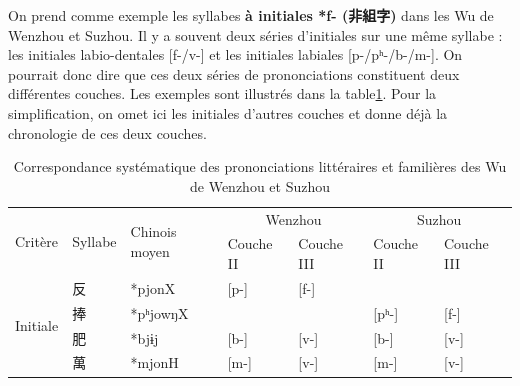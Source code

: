 \documentclass{scrbook}
\newcounter{c}[subsubsection]
\newcommand{\difwenbai}{couches archaïque et récente\xspace}
\newcommand{\illustre}{Les exemples sont illustrés dans la table\xspace}
\newcommand{\termyyx}[1]{\textbf{#1}}
\begin{document}
\begin{sloppypar}
On prend comme exemple les syllabes \termyyx{à initiales *f- (非組字)} dans les Wu de Wenzhou et Suzhou. Il y a souvent deux séries d'initiales sur une même syllabe : les initiales labio-dentales [f-/v-] et les initiales labiales [p-/pʰ-/b-/m-]. On pourrait donc dire que ces deux séries de prononciations constituent deux différentes couches. \illustre \ref{tab:exemple_corsp_syst_wenzhou_suzhou}. Pour la simplification, on omet ici les initiales d'autres couches et donne déjà la chronologie de ces deux couches.

\begin{table}[htbp]
  \centering
    \begin{tabular}{lllllll}
    \toprule
    \multirow{2}[2]{*}{Critère} & \multirow{2}[2]{*}{Syllabe} & \multirow{2}[2]{*}{Chinois moyen} & \multicolumn{2}{c}{Wenzhou} & \multicolumn{2}{c}{Suzhou} \\
          &       &       & Couche II & Couche III & Couche II & Couche III \\
    \midrule
    \multirow{4}[2]{*}{Initiale} & 反     & *pjonX & [p-]  & [f-]  &       &  \\
          & 捧     & *pʰjowŋX &       &       & [pʰ-] & [f-] \\
          & 肥     & *bjɨj & [b-]  & [v-]  & [b-]  & [v-] \\
          & 萬     & *mjonH & [m-]  & [v-]  & [m-]  & [v-] \\
	\bottomrule
    \end{tabular}%
  \caption{Correspondance systématique des prononciations littéraires et familières des Wu de Wenzhou et Suzhou}
  \label{tab:exemple_corsp_syst_wenzhou_suzhou}%
\end{table}%


\end{sloppypar}
\end{document}

